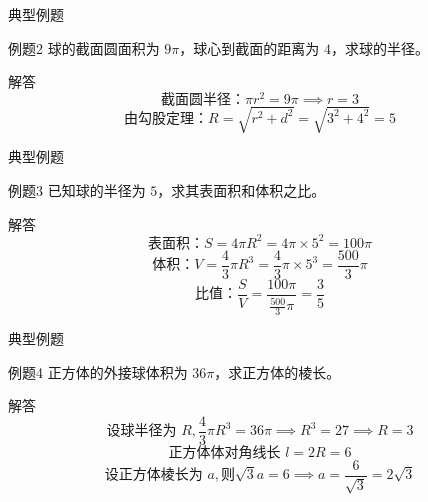   
  \begin{frame}{典型例题}
    \begin{exampleblock}{例题2}
        球的截面圆面积为 \(9\pi\)，球心到截面的距离为 \(4\)，求球的半径。
    \end{exampleblock}
    
    \pause
    
    \begin{alertblock}{解答}
        \[
        \text{截面圆半径：} \pi r^2 = 9\pi \implies r = 3
        \]
        \[
        \text{由勾股定理：} R = \sqrt{r^2 + d^2} = \sqrt{3^2 + 4^2} = 5
        \]
    \end{alertblock}
  \end{frame}
  
  \begin{frame}{典型例题}
    \begin{exampleblock}{例题3}
        已知球的半径为 \(5\)，求其表面积和体积之比。
    \end{exampleblock}
    
    \pause
    
    \begin{alertblock}{解答}
        \[
        \text{表面积：} S = 4\pi R^2 = 4\pi \times 5^2 = 100\pi
        \]
        \[
        \text{体积：} V = \frac{4}{3}\pi R^3 = \frac{4}{3}\pi \times 5^3 = \frac{500}{3}\pi
        \]
        \[
        \text{比值：} \frac{S}{V} = \frac{100\pi}{\frac{500}{3}\pi} = \frac{3}{5}
        \]
    \end{alertblock}
  \end{frame}
  
  
  \begin{frame}{典型例题}
    \begin{exampleblock}{例题4}
        正方体的外接球体积为 \(36\pi\)，求正方体的棱长。
    \end{exampleblock}
    
    \pause
    
    \begin{alertblock}{解答}
        \[
        \text{设球半径为 } R,\frac{4}{3}\pi R^3 = 36\pi \implies R^3 = 27 \implies R = 3
        \]
        \[
        \text{正方体体对角线长 } l = 2R = 6
        \]
        \[
        \text{设正方体棱长为 } a,则 \sqrt{3}a = 6 \implies a = \frac{6}{\sqrt{3}} = 2\sqrt{3}
        \]
    \end{alertblock}
  \end{frame}
  
